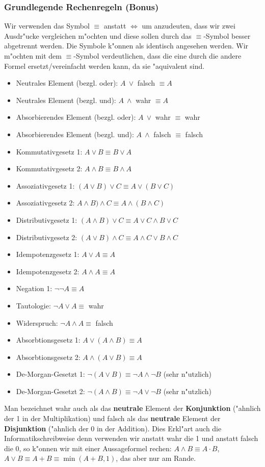 \subsubsection{Grundlegende Rechenregeln (Bonus)}
Wir verwenden das Symbol $\equiv$ anstatt $\iff$ um anzudeuten, dass wir zwei Ausdr"ucke vergleichen m"ochten und diese sollen durch das $\equiv$-Symbol besser abgetrennt werden. Die Symbole k"onnen als identisch angesehen werden. Wir m"ochten mit dem $\equiv$-Symbol verdeutlichen, dass die eine durch die andere Formel ersetzt/vereinfacht werden kann, da sie "aquivalent sind.
\begin{itemize}
\item Neutrales Element (bezgl. oder): $A \ \lor $ falsch $\equiv A$
\item Neutrales Element (bezgl. und): $A \ \land $ wahr $\equiv A$
\item Absorbierendes Element (bezgl. oder): $A \ \lor $ wahr $\equiv$ wahr
\item Absorbierendes Element (bezgl. und): $A \ \land $ falsch $\equiv$ falsch
\item Kommutativgesetz 1: $A \lor B \equiv B \lor A$
\item Kommutativgesetz 2: $A \land B \equiv B \land A$
\item Assoziativgesetz 1: $(A \lor B) \lor C \equiv A \lor (B \lor C)$
\item Assoziativgesetz 2: $A \land B) \land C \equiv A \land (B \land C)$
\item Distributivgesetz 1: $(A \land B) \lor C \equiv A \lor C \land  B \lor C$
\item Distributivgesetz 2: $(A \lor B) \land C \equiv A \land C \lor B \land C$
\item Idempotenzgesetz 1: $A \lor A \equiv A$
\item Idempotenzgesetz 2: $A \land A \equiv A$
\item Negation 1: $\neg \neg A \equiv A$
\item Tautologie: $\neg A \lor A \equiv $ wahr
\item Widerspruch: $\neg A \land A \equiv$ falsch
\item Absorbtionsgesetz 1: $A \lor (A \land B) \equiv A$
\item Absorbtionsgesetz 2: $A \land (A \lor B) \equiv A$
\item De-Morgan-Gesetzt 1: $\neg (A \lor B) \equiv \neg A \land \neg B$ (sehr n"utzlich)
\item De-Morgan-Gesetzt 2: $\neg (A \land B) \equiv \neg A \lor \neg B$ (sehr n"utzlich)
\end{itemize}
Man bezeichnet wahr auch als das \textbf{neutrale} Element der \textbf{Konjunktion} ("ahnlich der 1 in der Multiplikation) und falsch als das \textbf{neutrale} Element der \textbf{Disjunktion} ("ahnlich der 0 in der Addition). Dies Erkl"art auch die Informatikschreibweise denn verwenden wir anstatt wahr die 1 und anstatt falsch die 0, so k"onnen wir mit einer Aussageformel rechen: $A \land B \equiv A \cdot B$, $A \lor B \equiv A + B \equiv \min(A + B, 1)$, das aber nur am Rande.

